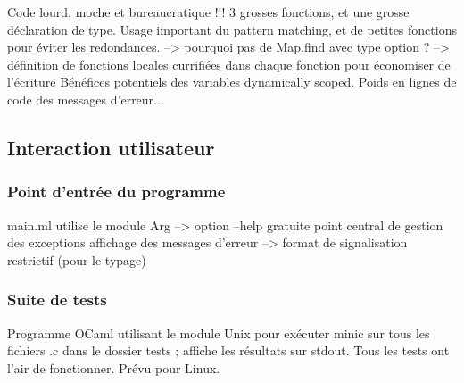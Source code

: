 \documentclass[a4paper, 11pt]{article}
\begin{document}
Code lourd, moche et bureaucratique !!!
3 grosses fonctions, et une grosse déclaration de type.
Usage important du pattern matching, et de petites fonctions pour éviter les redondances.
--> pourquoi pas de Map.find avec type option ?
--> définition de fonctions locales currifiées dans chaque fonction pour
  économiser de l'écriture
Bénéfices potentiels des variables dynamically scoped.
Poids en lignes de code des messages d'erreur...

\subsection{Interaction utilisateur}

\subsubsection{Point d'entrée du programme}

main.ml
utilise le module Arg --> option --help gratuite
point central de gestion des exceptions
affichage des messages d'erreur
--> format de signalisation restrictif (pour le typage)

\subsubsection{Suite de tests}

Programme OCaml utilisant le module Unix pour exécuter minic sur tous les fichiers .c
dans le dossier tests ; affiche les résultats sur stdout.
Tous les tests ont l'air de fonctionner.
Prévu pour Linux.
\end{document}
